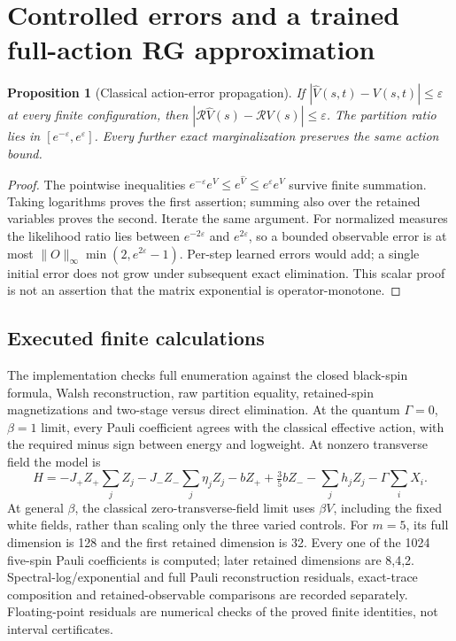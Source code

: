 \documentclass[11pt,oneside,openany]{book}
\newtheorem{proposition}[theorem]{Proposition}
\theoremstyle{definition}\newtheorem{definition}[theorem]{Definition}
\theoremstyle{remark}\newtheorem{remark}[theorem]{Remark}
\begin{document}
\section{Controlled errors and a trained full-action RG approximation}
\label{sec:rg-details}
\begin{proposition}[Classical action-error propagation]
If $|\widehat V(s,t)-V(s,t)|\le\varepsilon $ at every finite configuration,
then $|\mathcal R\widehat V(s)-\mathcal RV(s)|\le\varepsilon $.
The partition ratio lies in $[e^{-\varepsilon},e^{\varepsilon}]$.
Every further \emph{exact} marginalization preserves the same action bound.
\end{proposition}
\begin{proof}
The pointwise inequalities
$ e^{-\varepsilon}e^V\le e^{\widehat V}\le e^\varepsilon e^V $
survive finite summation. Taking logarithms proves the first assertion;
summing also over the retained variables proves the second. Iterate the
same argument. For normalized measures the likelihood ratio lies between
$ e^{-2\varepsilon}$ and $ e^{2\varepsilon}$, so a bounded observable error
is at most $\|O\|_\infty\min(2,e^{2\varepsilon}-1)$. Per-step learned
errors would add; a single initial error does not grow under subsequent
exact elimination. This scalar proof is not an assertion that the matrix
exponential is operator-monotone.
\end{proof}

\subsection{Executed finite calculations}
The implementation checks full enumeration against the closed black-spin
formula, Walsh reconstruction, raw partition equality, retained-spin
magnetizations and two-stage versus direct elimination. At the quantum
$\Gamma=0$, $\beta=1$ limit, every Pauli coefficient agrees with the
classical effective action, with the required minus sign between energy
and logweight. At nonzero transverse field the model is
\[
 H=-J_+Z_+\sum_jZ_j-J_-Z_-\sum_j\eta_jZ_j-bZ_+
       +\tfrac 35 bZ_--\sum_jh_jZ_j-\Gamma\sum_iX_i.
\]
At general $\beta $, the classical zero-transverse-field limit uses $\beta V $, including the fixed white fields, rather than scaling only the three varied controls.
For $ m=5$, its full dimension is 128 and the first retained dimension is 32.
Every one of the 1024 five-spin Pauli coefficients is computed; later
retained dimensions are 8,4,2. Spectral-log/exponential and full Pauli
reconstruction residuals, exact-trace composition and retained-observable
comparisons are recorded separately. Floating-point residuals are numerical
checks of the proved finite identities, not interval certificates.
\end{document}
